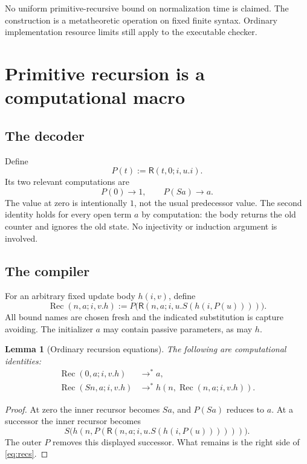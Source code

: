\documentclass[11pt]{article}
\newtheorem{lemma}[theorem]{Lemma}
\theoremstyle{definition}
\theoremstyle{remark}
\newcommand{\R}{\mathsf R}
\newcommand{\Rec}{\operatorname{Rec}}
\begin{document}
No uniform primitive-recursive bound on normalization time is
claimed. The construction is a metatheoretic operation on fixed
finite syntax. Ordinary implementation resource limits still
apply to the executable checker.

\section{Primitive recursion is a computational macro}
\label{sec:compiler}

\subsection{The decoder}

Define
\[
 P(t):=\R(t,0;i,u.i).
\]
Its two relevant computations are
\[
 P(0)\longrightarrow 1,\qquad P(Sa)\longrightarrow a.        \tag{P}
\]
The value at zero is intentionally $1$, not the usual predecessor
value. The second identity holds for every open term $a$ by
computation: the body returns the old counter and ignores the
old state. No injectivity or induction argument is involved.

\subsection{The compiler}

For an arbitrary fixed update body $h(i,v)$, define
\begin{equation}
 \Rec(n,a;i,v.h)
 :=
 P\bigl(\R(n,a;i,u.S(h(i,P(u))))\bigr).
 \label{eq:rec}
\end{equation}
All bound names are chosen fresh and the indicated substitution
is capture avoiding. The initializer $a$ may contain passive
parameters, as may $h$.

\begin{lemma}[Ordinary recursion equations]
\label{lem:rec}
The following are computational identities:
\begin{align}
 \Rec(0,a;i,v.h)&\longrightarrow^* a, \label{eq:rec0}\\
 \Rec(Sn,a;i,v.h)&\longrightarrow^*
 h(n,\Rec(n,a;i,v.h)). \label{eq:recs}
\end{align}
\end{lemma}
\begin{proof}
At zero the inner recursor becomes $Sa$, and $P(Sa)$ reduces to
$a$. At a successor the inner recursor becomes
\[
 S\bigl(h(n,P(\R(n,a;i,u.S(h(i,P(u))))))\bigr).
\]
The outer $P$ removes this displayed successor. What remains is
the right side of \eqref{eq:recs}.
\end{proof}
\end{document}

